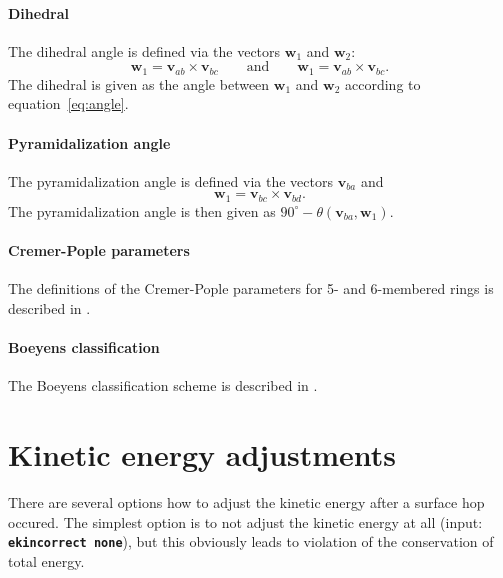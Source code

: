 \documentclass[a4paper,11pt,DIV=15,openany,twoside=false]{scrbook}
\newcommand{\ttt}[1]{\textbf{\texttt{#1}}}
\newcommand{\VEC}[1]{\ensuremath{\mathbf{#1}}}
\begin{document}
\paragraph{Dihedral}

The dihedral angle is defined via the vectors $\VEC{w}_1$ and $\VEC{w}_2$:
\begin{equation}
  \VEC{w}_1=\VEC{v}_{ab}\times\VEC{v}_{bc}\qquad\text{and}\qquad\VEC{w}_1=\VEC{v}_{ab}\times\VEC{v}_{bc}.
\end{equation}
The dihedral is given as the angle between $\VEC{w}_1$ and $\VEC{w}_2$ according to equation~\eqref{eq:angle}.

\paragraph{Pyramidalization angle}

The pyramidalization angle is defined via the vectors $\VEC{v}_{ba}$ and 
\begin{equation}
  \VEC{w}_1=\VEC{v}_{bc}\times\VEC{v}_{bd}.
\end{equation}
The pyramidalization angle is then given as $90^\circ - \theta(\VEC{v}_{ba},\VEC{w}_1)$.

\paragraph{Cremer-Pople parameters}

The definitions of the Cremer-Pople parameters for 5- and 6-membered rings is described in \cite{Cremer1975JACS}.

\paragraph{Boeyens classification}

The Boeyens classification scheme is described in \cite{Boeyens1976JCMS}.

\section{Kinetic energy adjustments}\label{met:ekinadj}

There are several options how to adjust the kinetic energy after a surface hop occured. The simplest option is to not adjust the kinetic energy at all (input: \ttt{ekincorrect none}), but this obviously leads to violation of the conservation of total energy.
\end{document}
